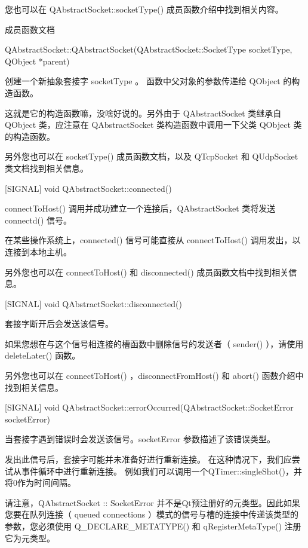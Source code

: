 您也可以在 QAbstractSocket::socketType() 成员函数介绍中找到相关内容。

\splitLine

成员函数文档

QAbstractSocket::QAbstractSocket(QAbstractSocket::SocketType
socketType, QObject *parent)

创建一个新抽象套接字 socketType 。 函数中父对象的参数传递给 QObject 的构造函数。

这就是它的构造函数嘛，没啥好说的。另外由于 QAbstractSocket 类继承自 QObject 类，应注意在 QAbstractSocket 类构造函数中调用一下父类 QObject 类的构造函数。

另外您也可以在 socketType() 成员函数文档，以及 QTcpSocket 和 QUdpSocket 类文档找到相关信息。

[SIGNAL] void QAbstractSocket::connected()

connectToHost() 调用并成功建立一个连接后，QAbstractSocket 类将发送 connectd() 信号。


\begin{notice}
在某些操作系统上，connected() 信号可能直接从 connectToHost() 调用发出，以连接到本地主机。
\end{notice}

另外您也可以在 connectToHost() 和 disconnected() 成员函数文档中找到相关信息。

[SIGNAL] void QAbstractSocket::disconnected()

套接字断开后会发送该信号。

\begin{notice}[警告]
如果您想在与这个信号相连接的槽函数中删除信号的发送者（ sender() ），请使用 deleteLater() 函数。
\end{notice}

另外您也可以在 connectToHost() ，disconnectFromHost() 和 abort() 函数介绍中找到相关信息。

[SIGNAL] void
QAbstractSocket::errorOccurred(QAbstractSocket::SocketError
socketError)

当套接字遇到错误时会发送该信号。socketError 参数描述了该错误类型。

发出此信号后，套接字可能并未准备好进行重新连接。 在这种情况下，我们应尝试从事件循环中进行重新连接。 例如我们可以调用一个QTimer::singleShot()，并将0作为时间间隔。

请注意，QAbstractSocket :: SocketError 并不是Qt预注册好的元类型。因此如果您要在队列连接（ queued connections ）模式的信号与槽的连接中传递该类型的参数，您必须使用 Q\_DECLARE\_METATYPE() 和 qRegisterMetaType() 注册它为元类型。

